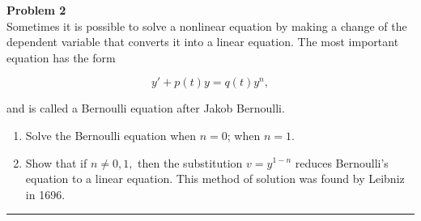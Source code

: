 \documentclass[11pt]{article}
\newcounter{ea}
\newcommand {\Problem} [1] { \bigskip \noindent\Large {\bf Problem #1} \\  \normalsize}
\newcommand {\myLine} {\bigskip \noindent\rule{17.7cm}{0.4pt} \medskip}
\begin{document}
\eject


{\color {Blue} 

\Problem 2 Sometimes it is possible to solve a nonlinear equation by making a change of the dependent variable that converts it into a linear equation. The most important equation has the form

$$y' + p(t)y = q(t)y^n,$$

and is called a Bernoulli equation after Jakob Bernoulli. 

\begin{enumerate}[label=(\alph*)]
\item  Solve the Bernoulli equation when $n=0$; when $n=1$.

\item  Show that if $n\neq 0,1,$ then the substitution $v = y^{1-n}$ reduces Bernoulli's equation to a linear equation. This method of solution was found by Leibniz in 1696.

\end{enumerate}

\myLine
}
\end{document}
